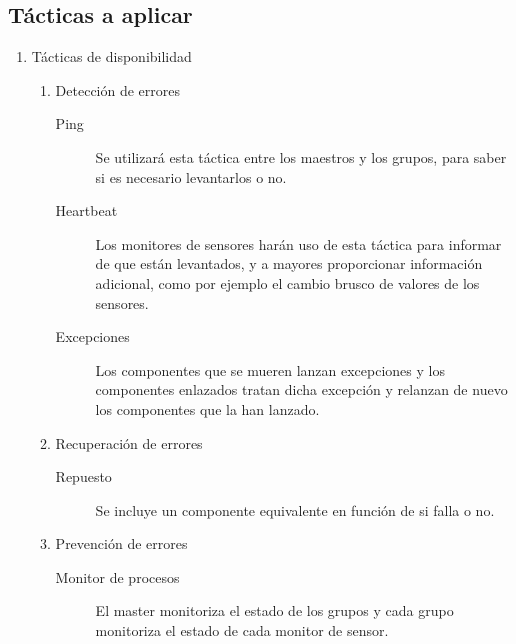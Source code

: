 \documentclass[a4paper,10pt]{article}
\begin{document}
\subsection{Tácticas a aplicar}
\begin{enumerate}
  \item Tácticas de disponibilidad
  \begin{enumerate}
    \item Detección de errores
    \begin{description}
      \item [Ping] Se utilizará esta táctica entre los maestros y los grupos, 
para saber si es necesario levantarlos o no.
      \item [Heartbeat] Los monitores de sensores harán uso de esta táctica para 
informar de que están levantados, y a mayores proporcionar información 
adicional, como por ejemplo el cambio brusco de valores de los sensores.
      \item [Excepciones] Los componentes que se mueren lanzan excepciones y los 
componentes enlazados tratan dicha excepción y relanzan de nuevo los componentes 
que la han lanzado.
    \end{description}
    
    \item Recuperación de errores
    \begin{description}
      \item [Repuesto] Se incluye un componente equivalente en función de si 
falla o no.
    \end{description}
    
    \item Prevención de errores
    \begin{description}
      \item [Monitor de procesos] El master monitoriza el estado de los grupos y 
cada grupo monitoriza el estado de cada monitor de sensor.
    \end{description}
  \end{enumerate}
  

\end{enumerate}
\end{document}
